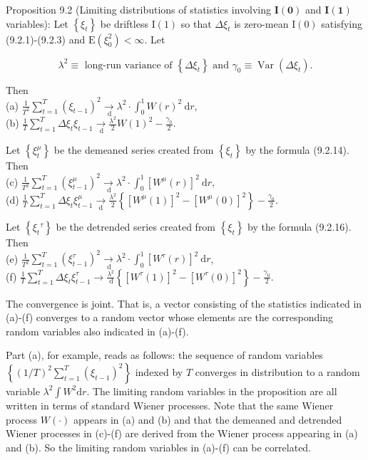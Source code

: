 \documentclass[10pt]{article}
\begin{document}
Proposition 9.2 (Limiting distributions of statistics involving $\mathbf{I}(\mathbf{0})$ and $\mathbf{I}(\mathbf{1})$ variables): Let $\left\{\xi_{t}\right\}$ be driftless $\mathrm{I}(1)$ so that $\Delta \xi_{t}$ is zero-mean $\mathrm{I}(0)$ satisfying (9.2.1)-(9.2.3) and $\mathrm{E}\left(\xi_{0}^{2}\right)<\infty$. Let

$$
\lambda^{2} \equiv \text { long-run variance of }\left\{\Delta \xi_{t}\right\} \text { and } \gamma_{0} \equiv \operatorname{Var}\left(\Delta \xi_{t}\right) .
$$

Then\\
(a) $\frac{1}{T^{2}} \sum_{t=1}^{T}\left(\xi_{t-1}\right)^{2} \underset{\mathrm{~d}}{\rightarrow} \lambda^{2} \cdot \int_{0}^{1} W(r)^{2} \mathrm{~d} r$,\\
(b) $\frac{1}{T} \sum_{t=1}^{T} \Delta \xi_{t} \xi_{t-1} \underset{\mathrm{~d}}{\rightarrow} \frac{\lambda^{2}}{2} W(1)^{2}-\frac{\gamma_{0}}{2}$.

Let $\left\{\xi_{t}^{\mu}\right\}$ be the demeaned series created from $\left\{\xi_{t}\right\}$ by the formula (9.2.14). Then\\
(c) $\frac{1}{T^{2}} \sum_{t=1}^{T}\left(\xi_{t-1}^{\mu}\right)^{2} \underset{\mathrm{~d}}{\rightarrow} \lambda^{2} \cdot \int_{0}^{1}\left[W^{\mu}(r)\right]^{2} \mathrm{~d} r$,\\
(d) $\frac{1}{T} \sum_{t=1}^{T} \Delta \xi_{t} \xi_{t-1}^{\mu} \xrightarrow[\mathrm{d}]{ } \frac{\lambda^{2}}{2}\left\{\left[W^{\mu}(1)\right]^{2}-\left[W^{\mu}(0)\right]^{2}\right\}-\frac{\gamma_{0}}{2}$.

Let $\left\{\xi_{t}{ }^{\tau}\right\}$ be the detrended series created from $\left\{\xi_{t}\right\}$ by the formula (9.2.16). Then\\
(e) $\frac{1}{T^{2}} \sum_{t=1}^{T}\left(\xi_{t-1}^{\tau}\right)^{2} \underset{\mathrm{~d}}{\rightarrow} \lambda^{2} \cdot \int_{0}^{1}\left[W^{\tau}(r)\right]^{2} \mathrm{~d} r$,\\
(f) $\frac{1}{T} \sum_{t=1}^{T} \Delta \xi_{t} \xi_{t-1}^{\tau} \rightarrow \frac{\lambda^{2}}{\mathrm{~d}}\left\{\left[W^{\tau}(1)\right]^{2}-\left[W^{\tau}(0)\right]^{2}\right\}-\frac{\gamma_{0}}{2}$.

The convergence is joint. That is, a vector consisting of the statistics indicated in (a)-(f) converges to a random vector whose elements are the corresponding random variables also indicated in (a)-(f).

Part (a), for example, reads as follows: the sequence of random variables $\left\{(1 / T)^{2}\right. \left.\sum_{t=1}^{T}\left(\xi_{t-1}\right)^{2}\right\}$ indexed by $T$ converges in distribution to a random variable $\lambda^{2} \int W^{2} \mathrm{d} r$. The limiting random variables in the proposition are all written in terms of standard Wiener processes. Note that the same Wiener process $W(\cdot)$ appears in (a) and (b) and that the demeaned and detrended Wiener processes in (c)-(f) are derived from the Wiener process appearing in (a) and (b). So the limiting random variables in (a)-(f) can be correlated.
\end{document}
